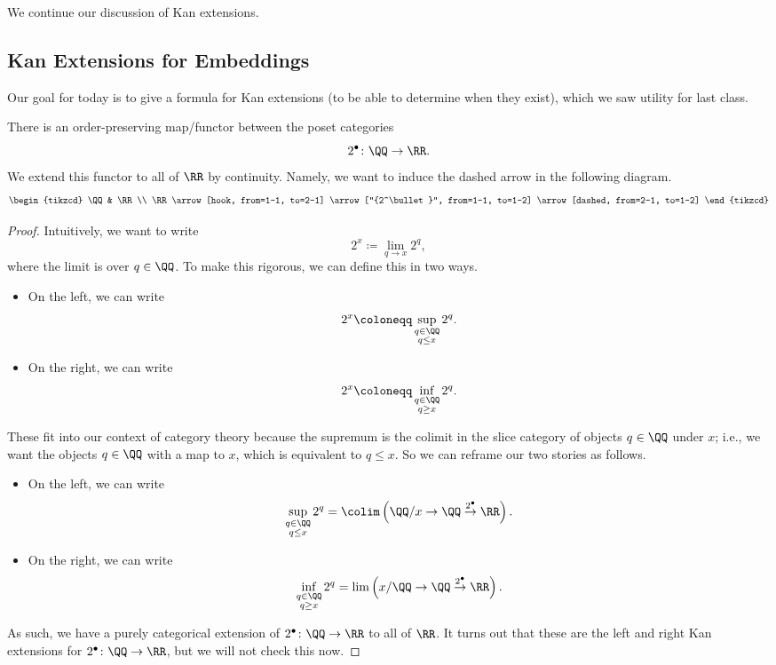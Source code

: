 \documentclass[../notes.tex]{subfiles}
\begin{document}

We continue our discussion of Kan extensions.

\subsection{Kan Extensions for Embeddings}
Our goal for today is to give a formula for Kan extensions (to be able to determine when they exist), which we saw utility for last class.
\begin{exe}
	There is an order-preserving map/functor between the poset categories
	\[2^\bullet\colon\QQ\to\RR.\]
	We extend this functor to all of $\RR$ by continuity. Namely, we want to induce the dashed arrow in the following diagram.
	\[\begin{tikzcd}
		\QQ & \RR \\
		\RR
		\arrow[hook, from=1-1, to=2-1]
		\arrow["{2^\bullet}", from=1-1, to=1-2]
		\arrow[dashed, from=2-1, to=1-2]
	\end{tikzcd}\]
\end{exe}
\begin{proof}
	Intuitively, we want to write
	\[2^x\coloneqq\lim_{q\to x}2^q,\]
	where the limit is over $q\in\QQ$. To make this rigorous, we can define this in two ways.
	\begin{itemize}
		\item On the left, we can write
		\[2^x\coloneqq\sup_{\substack{q\in\QQ\\q\le x}}2^q.\]
		\item On the right, we can write
		\[2^x\coloneqq\inf_{\substack{q\in\QQ\\q\ge x}}2^q.\]
	\end{itemize}
	These fit into our context of category theory because the supremum is the colimit in the slice category of objects $q\in\QQ$ under $x$; i.e., we want the objects $q\in\QQ$ with a map to $x$, which is equivalent to $q\le x$. So we can reframe our two stories as follows.
	\begin{itemize}
		\item On the left, we can write
		\[\sup_{\substack{q\in\QQ\\q\le x}}2^q=\colim\left(\QQ/x\to\QQ\stackrel{2^\bullet}\to\RR\right).\]
		\item On the right, we can write
		\[\inf_{\substack{q\in\QQ\\q\ge x}}2^q=\lim\left(x/\QQ\to\QQ\stackrel{2^\bullet}\to\RR\right).\]
	\end{itemize}
	As such, we have a purely categorical extension of $2^\bullet\colon\QQ\to\RR$ to all of $\RR$. It turns out that these are the left and right Kan extensions for $2^\bullet\colon\QQ\to\RR$, but we will not check this now.
\end{proof}
\end{document}
